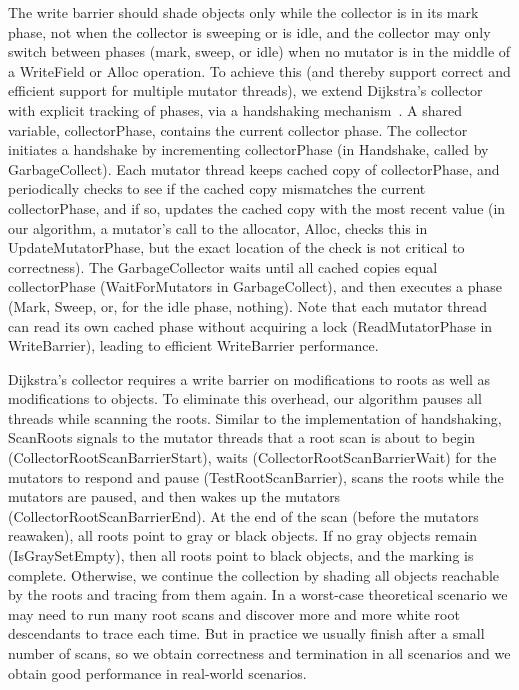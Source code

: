 The write barrier should shade objects only while the collector is in its mark phase,
not when the collector is sweeping or is idle, and the collector may only switch between phases (mark, sweep, or idle)
when no mutator is in the middle of a WriteField or Alloc operation.
To achieve this (and thereby support correct and efficient support for multiple mutator threads),
we extend Dijkstra's collector with explicit tracking of phases, via a handshaking mechanism~\cite{doli93,doli94}.
A shared variable, collectorPhase, contains the current collector phase.
The collector initiates a handshake by incrementing collectorPhase (in Handshake, called by GarbageCollect).
Each mutator thread keeps cached copy of collectorPhase, and periodically checks to see if
the cached copy mismatches the current collectorPhase, and if so, updates the cached copy
with the most recent value
(in our algorithm, a mutator's call to the allocator, Alloc, checks this in UpdateMutatorPhase,
but the exact location of the check is not critical to correctness).
The GarbageCollector waits until all cached copies equal collectorPhase (WaitForMutators in GarbageCollect),
and then executes a phase (Mark, Sweep, or, for the idle phase, nothing).
Note that each mutator thread can read its own cached phase without acquiring a lock (ReadMutatorPhase in WriteBarrier),
leading to efficient WriteBarrier performance.

Dijkstra's collector requires a write barrier on modifications to roots as well as modifications to objects.
To eliminate this overhead, our algorithm pauses all threads while scanning the roots.
Similar to the implementation of handshaking, ScanRoots signals to the mutator threads that a root scan
is about to begin (CollectorRootScanBarrierStart), waits (CollectorRootScanBarrierWait) for the
mutators to respond and pause (TestRootScanBarrier), scans the roots while the mutators are paused,
and then wakes up the mutators (CollectorRootScanBarrierEnd).
At the end of the scan (before the mutators reawaken), all roots point to gray or black objects.
If no gray objects remain (IsGraySetEmpty), then all roots point to black objects, and the marking is complete.
Otherwise, we continue the collection by shading all objects reachable by the roots and tracing from them again.
In a worst-case theoretical scenario we may need to run many root scans and discover more and more white root descendants to trace each time. 
But in practice we usually finish after a small number of scans,
so we obtain correctness and termination in all scenarios and we obtain good performance in real-world scenarios. 




